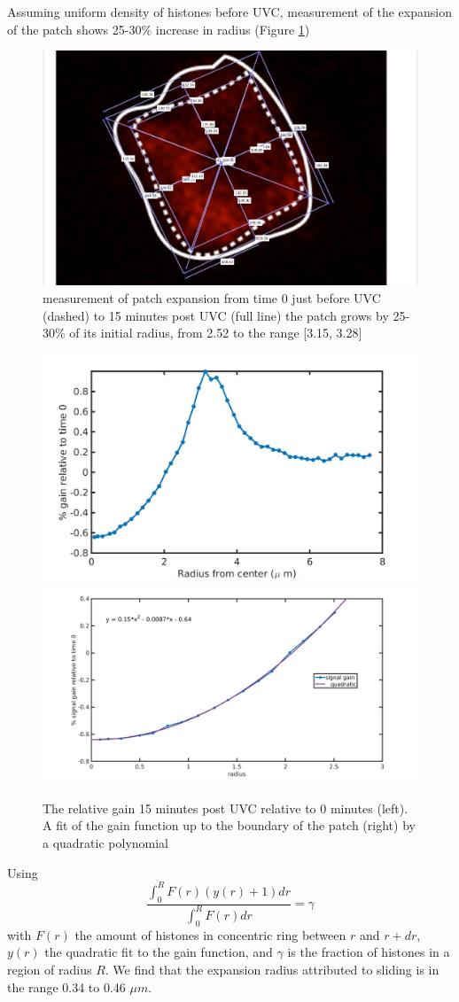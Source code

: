\documentclass[12pt]{report}
\begin{document}
		Assuming uniform density of histones before UVC, measurement of the expansion of the patch shows 25-30\% increase in radius (Figure \ref{fig:patchExpansionMeasurement})
		\begin{figure}[H]
			\centering
			\includegraphics[width=0.5\linewidth, height=0.3\textheight]{Images/PatchExpansion/patchExpansionMeasurement}
			\caption{\tiny{measurement of patch expansion from time 0  just before UVC (dashed) to 15 minutes post UVC (full line) the patch grows by 25-30\% of its initial radius, from 2.52 to the range [3.15,  3.28] }}
			\label{fig:patchExpansionMeasurement}
		\end{figure}
		
		
		\begin{figure}[H]
			\includegraphics[width=0.5\linewidth, height=0.3\textheight]{Images/PatchExpansion/relativeGainNucleosomesConcentric}
			\includegraphics[width=0.5\linewidth, height=0.3\textheight]{Images/PatchExpansion/nucleosomeSignalGainConcentricFit}
			\caption{The relative gain 15 minutes post UVC relative to 0 minutes (left). A fit of the gain function up to the boundary of the patch (right) by a quadratic polynomial}
			\label{fig:relativeGainNucleosomesConcentric}
		\end{figure}
		
		Using 		
		\begin{equation}\label{eq:HistonePreservationConcentric}
		\frac{\int_0^RF(r)(y(r)+1)dr}{\int_0^RF(r)dr} =\gamma
		\end{equation} 
		with $F(r)$ the amount of histones in concentric ring between $r$ and $r+dr$, $y(r)$ the quadratic fit to the gain function, and $\gamma$ is the fraction of histones in a region of radius $R$. We find that the expansion radius attributed to sliding is in the range 0.34 to 0.46 $\mu m$.  
		
\end{document}

